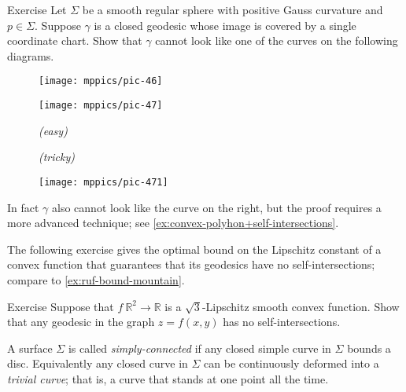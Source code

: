 \begin{thm}{Exercise}\label{ex:self-intersections}
Let $\Sigma$ be a smooth regular sphere with positive Gauss curvature and $p\in\Sigma$. 
Suppose $\gamma$ is a closed geodesic whose image is covered by a single coordinate chart.
Show that $\gamma$ cannot look like one of the curves on the following diagrams.

\begin{figure}[h]
\begin{minipage}{.48\textwidth}
\centering
\texttt{[image: mppics/pic-46]}
\end{minipage}
\hfill
\begin{minipage}{.48\textwidth}
\centering
\texttt{[image: mppics/pic-47]}
\end{minipage}

\medskip

\begin{minipage}{.48\textwidth}
\centering
\caption*{\textit{(easy)}}
\end{minipage}\hfill
\begin{minipage}{.48\textwidth}
\centering
\caption*{\textit{(tricky)}}
\end{minipage}
\vskip-4mm
\end{figure}

\end{thm}


\begin{wrapfigure}{r}{30 mm}
\vskip-0mm
\centering
\texttt{[image: mppics/pic-471]}
\end{wrapfigure}

In fact $\gamma$ also cannot look like the curve on the right, but the proof requires a more advanced technique;
see \ref{ex:convex-polyhon+self-intersections}.

The following exercise gives the optimal bound on the Lipschitz constant of a convex function that guarantees that its geodesics have no self-intersections;
compare to \ref{ex:ruf-bound-mountain}.

\begin{thm}{Exercise}\label{ex:sqrt(3)}
Suppose that $f\:\mathbb{R}^2\to\mathbb{R}$ is a $\sqrt{3}$-Lipschitz smooth convex function.
Show that any geodesic in the graph $z=f(x,y)$ has no self-intersections.
\end{thm}

A surface $\Sigma$ is called \emph{simply-connected} if any closed simple curve in $\Sigma$ bounds a disc.
Equivalently any closed curve in $\Sigma$ can be continuously deformed into a \emph{trivial curve}; that is, a curve that stands at one point all the time.

